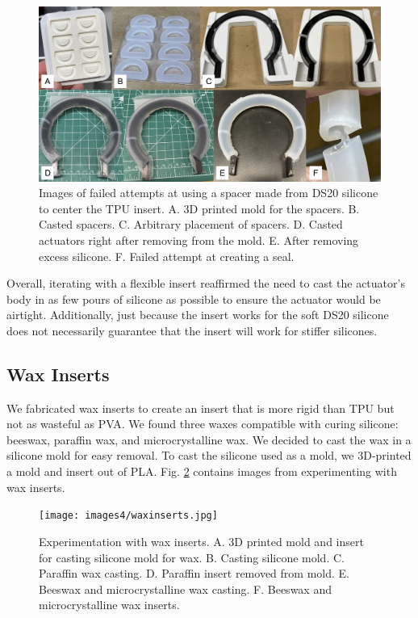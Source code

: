 \begin{figure}[ht]
    \centering
    \includegraphics[width=5.5 in]{images4/ds20spacer.jpg}
    \caption{Images of failed attempts at using a spacer made from DS20 silicone to center the TPU insert. A. 3D printed mold for the spacers. B. Casted spacers. C. Arbitrary placement of spacers. D. Casted actuators right after removing from the mold. E. After removing excess silicone. F. Failed attempt at creating a seal.}
    \label{fig:ds20spacer}
\end{figure}

Overall, iterating with a flexible insert reaffirmed the need to cast the actuator's body in as few pours of silicone as possible to ensure the actuator would be airtight. Additionally, just because the insert works for the soft DS20 silicone does not necessarily guarantee that the insert will work for stiffer silicones. 

\clearpage
\subsection{Wax Inserts}

We fabricated wax inserts to create an insert that is more rigid than TPU but not as wasteful as PVA. We found three waxes compatible with curing silicone: beeswax, paraffin wax, and microcrystalline wax. We decided to cast the wax in a silicone mold for easy removal. To cast the silicone used as a mold, we 3D-printed a mold and insert out of PLA. Fig. \ref{fig:waxinserts} contains images from experimenting with wax inserts. 

\begin{figure}[ht]
    \centering
    \texttt{[image: images4/waxinserts.jpg]}
    \caption{Experimentation with wax inserts. A. 3D printed mold and insert for casting silicone mold for wax. B. Casting silicone mold. C. Paraffin wax casting. D. Paraffin insert removed from mold. E. Beeswax and microcrystalline wax casting. F. Beeswax and microcrystalline wax inserts.}
    \label{fig:waxinserts}
\end{figure}


